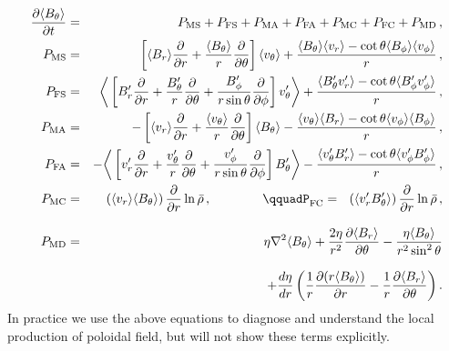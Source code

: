 \begin{eqnarray}
\frac{\partial \langle B_{\theta} \rangle }{\partial t} &=&
             P_\mathrm{MS} + P_\mathrm{FS}  
	   + P_\mathrm{MA} + P_\mathrm{FA} 
	   + P_\mathrm{MC} + P_\mathrm{FC}
	   + P_\mathrm{MD}\thinspace, \nonumber\\
P_\mathrm{MS} &=& \phn\advbm  \langle v_{\theta} \rangle  + \frac{ \langle B_{\theta} \rangle  \langle v_r \rangle - \cot\theta  \langle B_{\phi} \rangle  \langle v_{\phi} \rangle }{r}\thinspace,\\
P_\mathrm{FS} &=& \phn\bigg\langle \advbf v_{\theta}' \bigg\rangle  + \frac{ \langle B_{\theta}'v_r' \rangle -\cot\theta  \langle B_{\phi}'v_{\phi}' \rangle }{r}\thinspace,\\
P_\mathrm{MA} &=& -\advvm  \langle B_{\theta} \rangle  - \frac{ \langle v_{\theta} \rangle  \langle B_r \rangle -\cot\theta  \langle v_{\phi} \rangle  \langle B_{\phi} \rangle }{r}\thinspace,\\
P_\mathrm{FA} &=& -\bigg\langle \advvf B_{\theta}' \bigg\rangle  - \frac{ \langle v_{\theta}'B_r' \rangle - \cot\theta  \langle v_{\phi}'B_{\phi}' \rangle }{r}\thinspace,\\
P_\mathrm{MC} &=& \phn\left( \langle v_r \rangle  \langle B_{\theta} \rangle \right)\frac{\p}{\p r}\ln \rb\thinspace,  \qquad\qquad \qquad%
P_\mathrm{FC} = \phn\left(\langle v_r'B_{\theta}' \rangle \right)\frac{\p}{\p r}\ln \rb\thinspace,\\[3mm]
P_\mathrm{MD} &=&\phn\eta\nabla^{2} \langle B_{\theta} \rangle 
                 +\frac{2\eta}{r^2}\frac{\p \langle B_r \rangle }{\p \theta}
                 -\frac{\eta  \langle B_{\theta} \rangle}{r^2\sin^2\theta} \nonumber\\[3mm]
	& &\qquad\qquad\qquad + \frac{d\eta}{dr}\left(\frac{1}{r}\frac{\p (r \langle B_{\theta} \rangle )}{\p r}-\frac{1}{r}\frac{\p  \langle B_r \rangle }{\p \theta} \right).
\end{eqnarray}
In practice we use the above equations to diagnose and understand the
local production of poloidal field, but will not show these terms
explicitly.  

